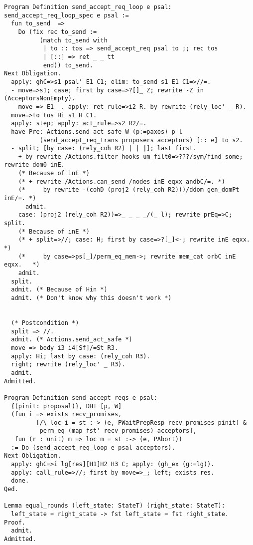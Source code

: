 \begin{landscape}
\begin{multicols*}{2}
\begin{lstlisting}[style=SourceCodeListing]
Program Definition send_accept_req_loop e psal: send_accept_req_loop_spec e psal :=
  fun to_send  =>
    Do (fix rec to_send :=
          (match to_send with
           | to :: tos => send_accept_req psal to ;; rec tos
           | [::] => ret _ _ tt
           end)) to_send.
Next Obligation.
  apply: ghC=>s1 psal' E1 C1; elim: to_send s1 E1 C1=>//=.
  - move=>s1; case; first by case=>?[]_ Z; rewrite -Z in (AcceptorsNonEmpty).
    move => E1 _. apply: ret_rule=>i2 R. by rewrite (rely_loc' _ R).
  move=>to tos Hi s1 H C1.
  apply: step; apply: act_rule=>s2 R2/=.
  have Pre: Actions.send_act_safe W (p:=paxos) p l
          (send_accept_req_trans proposers acceptors) [:: e] to s2.
  - split; [by case: (rely_coh R2) | | |]; last first.
    + by rewrite /Actions.filter_hooks um_filt0=>???/sym/find_some; rewrite dom0 inE.
    (* Because of inE *)
    (* + rewrite /Actions.can_send /nodes inE eqxx andbC/=. *)
    (*     by rewrite -(cohD (proj2 (rely_coh R2)))/ddom gen_domPt inE/=. *)
      admit.
    case: (proj2 (rely_coh R2))=>_ _ _ _/(_ l); rewrite prEq=>C; split.
    (* Because of inE *)
    (* + split=>//; case: H; first by case=>?[_]<-; rewrite inE eqxx. *)
    (*     by case=>ps[_]/perm_eq_mem->; rewrite mem_cat orbC inE eqxx.   *)
    admit.
  split.
  admit. (* Because of Hin *)
  admit. (* Don't know why this doesn't work *)


  (* Postcondition *)
  split => //.
  admit. (* Actions.send_act_safe *)
  move => body i3 i4[Sf]/=St R3.
  apply: Hi; last by case: (rely_coh R3).
  right; rewrite (rely_loc' _ R3).
  admit.
Admitted.

Program Definition send_accept_reqs e psal:
  {(pinit: proposal)}, DHT [p, W]
  (fun i => exists recv_promises,
         [/\ loc i = st :-> (e, PWaitPrepResp recv_promises pinit) &
          perm_eq (map fst' recv_promises) acceptors],
   fun (r : unit) m => loc m = st :-> (e, PAbort))
  := Do (send_accept_req_loop e psal acceptors).
Next Obligation.
  apply: ghC=>i lg[res][H1]H2 H3 C; apply: (gh_ex (g:=lg)).
  apply: call_rule=>//; first by move=>_; left; exists res.
  done.
Qed.

Lemma equal_rounds (left_state: StateT) (right_state: StateT):
  left_state = right_state -> fst left_state = fst right_state.
Proof.
  admit.
Admitted.


\end{lstlisting}
\end{multicols*}
\end{landscape}

